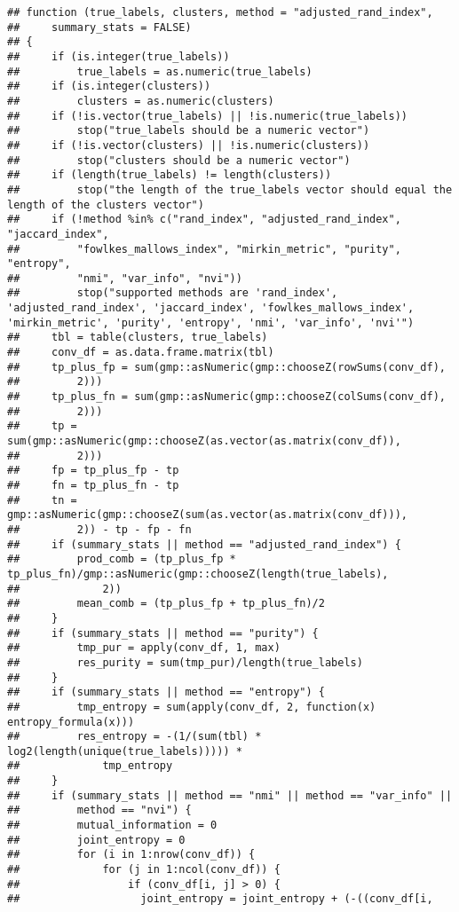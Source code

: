 \documentclass[
]{article}
\begin{document}
\begin{verbatim}
## function (true_labels, clusters, method = "adjusted_rand_index", 
##     summary_stats = FALSE) 
## {
##     if (is.integer(true_labels)) 
##         true_labels = as.numeric(true_labels)
##     if (is.integer(clusters)) 
##         clusters = as.numeric(clusters)
##     if (!is.vector(true_labels) || !is.numeric(true_labels)) 
##         stop("true_labels should be a numeric vector")
##     if (!is.vector(clusters) || !is.numeric(clusters)) 
##         stop("clusters should be a numeric vector")
##     if (length(true_labels) != length(clusters)) 
##         stop("the length of the true_labels vector should equal the length of the clusters vector")
##     if (!method %in% c("rand_index", "adjusted_rand_index", "jaccard_index", 
##         "fowlkes_mallows_index", "mirkin_metric", "purity", "entropy", 
##         "nmi", "var_info", "nvi")) 
##         stop("supported methods are 'rand_index', 'adjusted_rand_index', 'jaccard_index', 'fowlkes_mallows_index', 'mirkin_metric', 'purity', 'entropy', 'nmi', 'var_info', 'nvi'")
##     tbl = table(clusters, true_labels)
##     conv_df = as.data.frame.matrix(tbl)
##     tp_plus_fp = sum(gmp::asNumeric(gmp::chooseZ(rowSums(conv_df), 
##         2)))
##     tp_plus_fn = sum(gmp::asNumeric(gmp::chooseZ(colSums(conv_df), 
##         2)))
##     tp = sum(gmp::asNumeric(gmp::chooseZ(as.vector(as.matrix(conv_df)), 
##         2)))
##     fp = tp_plus_fp - tp
##     fn = tp_plus_fn - tp
##     tn = gmp::asNumeric(gmp::chooseZ(sum(as.vector(as.matrix(conv_df))), 
##         2)) - tp - fp - fn
##     if (summary_stats || method == "adjusted_rand_index") {
##         prod_comb = (tp_plus_fp * tp_plus_fn)/gmp::asNumeric(gmp::chooseZ(length(true_labels), 
##             2))
##         mean_comb = (tp_plus_fp + tp_plus_fn)/2
##     }
##     if (summary_stats || method == "purity") {
##         tmp_pur = apply(conv_df, 1, max)
##         res_purity = sum(tmp_pur)/length(true_labels)
##     }
##     if (summary_stats || method == "entropy") {
##         tmp_entropy = sum(apply(conv_df, 2, function(x) entropy_formula(x)))
##         res_entropy = -(1/(sum(tbl) * log2(length(unique(true_labels))))) * 
##             tmp_entropy
##     }
##     if (summary_stats || method == "nmi" || method == "var_info" || 
##         method == "nvi") {
##         mutual_information = 0
##         joint_entropy = 0
##         for (i in 1:nrow(conv_df)) {
##             for (j in 1:ncol(conv_df)) {
##                 if (conv_df[i, j] > 0) {
##                   joint_entropy = joint_entropy + (-((conv_df[i, 

\end{verbatim}
\end{document}
